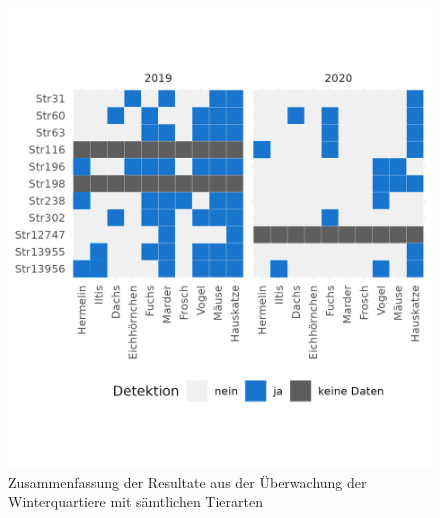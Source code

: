 \documentclass[
  oneside]{scrbook}
\begin{document}
\begin{figure}
\includegraphics[width=1\linewidth]{images/winterquartiere_resultate} \caption{Zusammenfassung der Resultate aus der Überwachung der Winterquartiere mit sämtlichen Tierarten}\label{fig:winterquartiereresultate}
\end{figure}
\end{document}
